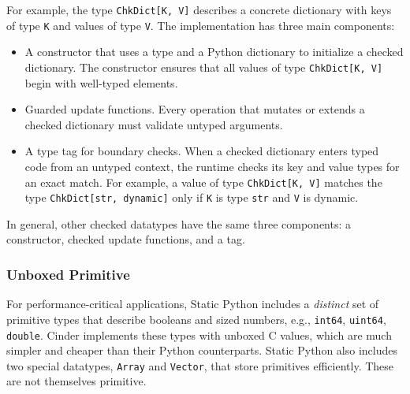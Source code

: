 \documentclass[english,cleveref,submission]{programming}
\newcommand{\SP}{Static Python}
\newcommand{\code}[1]{\texttt{#1}}
\begin{document}
For example, the type \code{ChkDict[K, V]} describes a concrete dictionary
with keys of type \code{K} and values of type \code{V}.
The implementation has three main components:
\begin{itemize}
  \item
    A constructor that uses a type and a Python dictionary
    to initialize a checked dictionary.
    The constructor ensures that all values of type \code{ChkDict[K, V]}
    begin with well-typed elements.
  \item
    Guarded update functions.
    Every operation that mutates or extends a checked dictionary must
    validate untyped arguments.
  \item
    A type tag for boundary checks.
    When a checked dictionary enters typed code from an untyped context,
    the runtime checks its key and value types for an exact match.
    For example, a value of type \code{ChkDict[K, V]} matches the type
    \code{ChkDict[str, dynamic]} only if \code{K} is type \code{str}
    and \code{V} is dynamic.
\end{itemize}
%
In general, other checked datatypes have the same three components:
a constructor, checked update functions, and a tag.


\subsubsection{Unboxed Primitive}
\label{s:c-types}




For performance-critical applications, \SP{} includes a \emph{distinct} set of primitive types
that describe booleans and sized numbers, e.g., \code{int64}, \code{uint64}, \code{double}.
Cinder implements these types with unboxed C values, which are much simpler and cheaper
than their Python counterparts.
\SP{} also includes two special datatypes, \code{Array} and \code{Vector}, that store primitives efficiently.
These are not themselves primitive.
\end{document}
